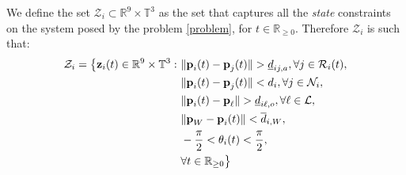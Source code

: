 We define the set $\mathcal{Z}_i \subset \mathbb{R}^{9} \times \mathbb{T}^3$
as the set that captures all the \textit{state} constraints on the system
posed by the problem \eqref{problem}, for $t \in \mathbb{R}_{\geq 0}$.
Therefore $\mathcal{Z}_i$ is such that:
\begin{align}
  \mathcal{Z}_i = \big\{\bm{\mathbf{z}}_i(t) \in \mathbb{R}^{9}\times \mathbb{T}^3 : \
      & \|\bm{\mathbf{p}}_i(t) - \bm{\mathbf{p}}_j(t)\| > \underline{d}_{ij,a}, \forall j \in \mathcal{R}_i(t), \label{constraint:p_1}\\
      & \|\bm{\mathbf{p}}_i(t) - \bm{\mathbf{p}}_j(t)\| < d_i, \forall j \in \mathcal{N}_i, \\
      & \|\bm{\mathbf{p}}_i(t) - \bm{\mathbf{p}}_{\ell}\| > \underline{d}_{i\ell,o}, \forall \ell \in \mathcal{L}, \\
      & \|\bm{\mathbf{p}}_W - \bm{\mathbf{p}}_i(t)\| < \overline{d}_{i,W}, \\
      & - \frac{\pi}{2} < \theta_i(t) < \frac{\pi}{2} \label{constraint:p_5}, \\
      &\forall t \in \mathbb{R}_{\geq 0}\big\}
\end{align}
